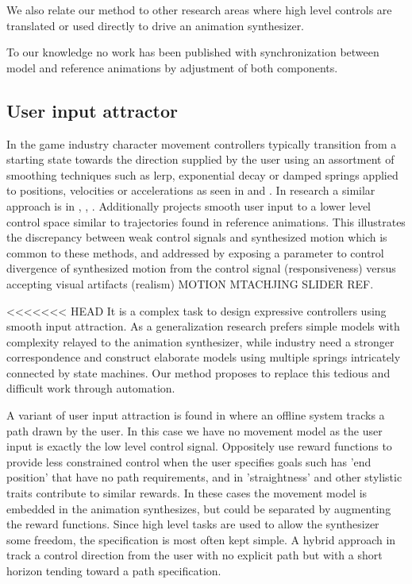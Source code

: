 We also relate our method to other research areas where high level controls are translated or used directly to drive an animation synthesizer. 

To our knowledge no work has been published with synchronization between model and reference animations by adjustment of both components.
\subsection{User input attractor}
In the game industry character movement controllers typically transition from a starting state towards the direction supplied by the user using an assortment of smoothing techniques such as lerp, exponential decay or damped springs applied to positions, velocities or accelerations as seen in \citep{buttner20} and \citep{holden21}. 
In research a similar approach is in \citep{mccann07}, \citep{holden.16}, \citep{Zhang18}. Additionally \citep{startke20} projects smooth user input to a lower level control space similar to trajectories found in reference animations. This illustrates the discrepancy between weak control signals and synthesized motion which is common to these methods, and addressed by exposing a parameter to control divergence of synthesized motion from the control signal (responsiveness) versus accepting visual artifacts (realism) MOTION MTACHJING SLIDER REF. 

<<<<<<< HEAD
It is a complex task to design expressive controllers using smooth input attraction. As a generalization research prefers simple models with complexity relayed to the animation synthesizer, while industry need a stronger correspondence and construct elaborate models using multiple springs intricately connected by state machines. Our method proposes to replace this tedious and difficult work through automation. 

A variant of user input attraction is found in \citep{treuille07} where an offline system tracks a path drawn by the user. In this case we have no movement model as the user input is exactly the low level control signal. Oppositely \citep{kovar02} use reward functions to provide less constrained control when the user specifies goals such has 'end position' that have no path requirements, and in \citep{lee18} 'straightness' and other stylistic traits contribute to similar rewards. In these cases the movement model is embedded in the animation synthesizes, but could be separated by augmenting the reward functions. Since high level tasks are used to allow the synthesizer some freedom, the specification is most often kept simple. A hybrid approach in \citep{lee10} track a control direction from the user with no explicit path but with a short horizon tending toward a path specification.


